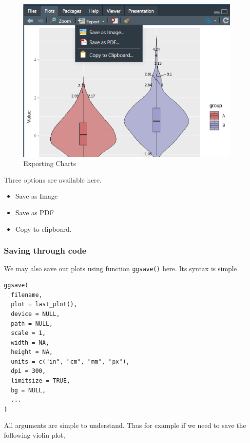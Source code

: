 \documentclass[
]{book}
\providecommand{\tightlist}{%
  \setlength{\itemsep}{0pt}\setlength{\parskip}{0pt}}
\begin{document}
\begin{figure}

{\centering \includegraphics[width=0.95\linewidth]{images/export} 

}

\caption{Exporting Charts}\label{fig:export1}
\end{figure}

Three options are available here.

\begin{itemize}
\tightlist
\item
  Save as Image
\item
  Save as PDF
\item
  Copy to clipboard.
\end{itemize}

\hypertarget{saving-through-code}{%
\subsubsection*{Saving through code}\label{saving-through-code}}

We may also save our plots using function \texttt{ggsave()} here. Its syntax is simple

\begin{verbatim}
ggsave(
  filename,
  plot = last_plot(),
  device = NULL,
  path = NULL,
  scale = 1,
  width = NA,
  height = NA,
  units = c("in", "cm", "mm", "px"),
  dpi = 300,
  limitsize = TRUE,
  bg = NULL,
  ...
)
\end{verbatim}

All arguments are simple to understand. Thus for example if we need to save the following violin plot,
\end{document}
